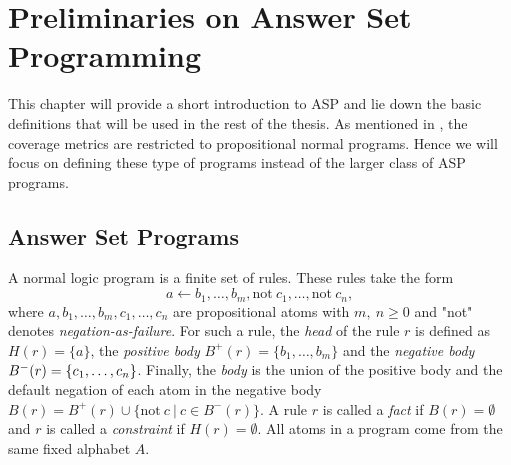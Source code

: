 
\chapter{Preliminaries on Answer Set Programming}
\label{ch:Preliminaries on answer set programming}
This chapter will provide a short introduction to ASP and lie down the basic definitions that will be used in the rest of the thesis. As mentioned in , the coverage metrics are restricted to propositional normal programs. Hence we will focus on defining these type of programs instead of the larger class of ASP programs.


\section{Answer Set Programs}
\label{sec:Preliminaries on answer set programming/Answer Set Programs}

A normal logic program is a finite set of rules. These rules take the form
\[
    a \leftarrow b_1, \ldots , b_m, \text{not}\ c_1, \ldots , \text{not}\ c_n,
\]
where \(a, b_1, \ldots , b_m, c_1, \ldots ,c_n\) are propositional atoms with \(m,\ n \geq 0\) and "not" denotes \emph{negation-as-failure}. For such a rule, the \emph{head} of the rule $r$ is defined as \(H(r) = \{a\}\), the \emph{positive body} \(B^+(r) = \{ b_1, \ldots , b_m\}\) and the \emph{negative body} \(B^-(r) = \nolinebreak \{c_1, \ldots ,c_n\}\). Finally, the \emph{body} is the union of the positive body and the default negation of each atom in the negative body \(B(r) = B^+(r) \cup \{\text{not}\ c\ |\ c \in B^-(r)\}\). A rule $r$ is called a \emph{fact} if \(B(r) = \emptyset\) and $r$ is called a \emph{constraint} if \(H(r) = \emptyset\).
All atoms in a program come from the same fixed alphabet $A$.

